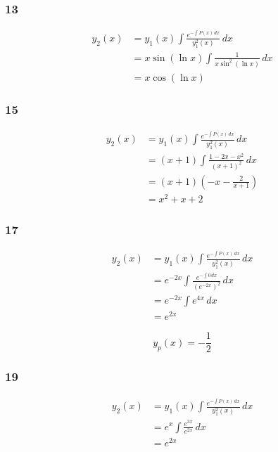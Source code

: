 \documentclass{article}
\begin{document}
\subsubsection{13}

\begin{align*}
  y_2(x) & = y_1(x) \int \frac{e^{-\int P(x) \,dx}}{y_1^2(x)} \,dx \\
         & = x \sin (\ln x) \int \frac{1}{x \sin^2 (\ln x)} \,dx   \\
         & = x \cos (\ln x)
\end{align*}

\subsubsection{15}

\begin{align*}
  y_2(x) & = y_1(x) \int \frac{e^{-\int P(x) \,dx}}{y_1^2(x)} \,dx \\
         & = (x + 1) \int \frac{1 - 2x - x^2}{(x + 1)^2} \,dx      \\
         & = (x + 1) \left( -x - \frac{2}{x + 1} \right)           \\
         & = x^2 + x + 2
\end{align*}

\subsubsection{17}

\begin{align*}
  y_2(x) & = y_1(x) \int \frac{e^{-\int P(x) \,dx}}{y_1^2(x)} \,dx  \\
         & = e^{-2x} \int \frac{e^{-\int 0 \,dx}}{(e^{-2x})^2} \,dx \\
         & = e^{-2x} \int e^{4x} \,dx                               \\
         & = e^{2x}
\end{align*}

\[y_p(x) = -\frac{1}{2}\]

\subsubsection{19}

\begin{align*}
  y_2(x) & = y_1(x) \int \frac{e^{-\int P(x) \,dx}}{y_1^2(x)} \,dx \\
         & = e^x \int \frac{e^{3x}}{e^{2x}} \,dx                   \\
         & = e^{2x}
\end{align*}
\end{document}
